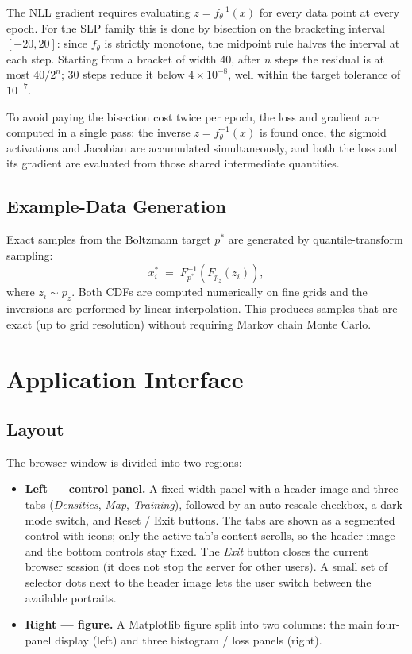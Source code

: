 \documentclass[11pt,a4paper]{article}
\newcommand{\pz}{p_z}
\newcommand{\ft}{f_{\!\theta}}
\begin{document}
The NLL gradient requires evaluating $z = \ft^{-1}(x)$ for every data
point at every epoch.  For the SLP family this is done by bisection on the
bracketing interval $[-20, 20]$: since $\ft$ is strictly monotone, the
midpoint rule halves the interval at each step.  Starting from a bracket
of width 40, after $n$ steps the residual is at most $40/2^n$; 30 steps
reduce it below $4\times10^{-8}$, well within the target tolerance of
$10^{-7}$.

To avoid paying the bisection cost twice per epoch, the loss and gradient
are computed in a single pass: the inverse $z = \ft^{-1}(x)$ is found
once, the sigmoid activations and Jacobian are accumulated simultaneously,
and both the loss and its gradient are evaluated from those shared
intermediate quantities.

\subsection{Example-Data Generation}

Exact samples from the Boltzmann target $p^*$ are generated by
quantile-transform sampling:
\begin{equation}
  x_i^* \;=\; F_{p^*}^{-1}\!\left(F_{\pz}(z_i)\right),
\end{equation}
where $z_i \sim \pz$.  Both CDFs are computed numerically on fine grids
and the inversions are performed by linear interpolation.  This produces
samples that are exact (up to grid resolution) without requiring Markov
chain Monte Carlo.

\section{Application Interface}

\subsection{Layout}

The browser window is divided into two regions:
\begin{itemize}
  \item \textbf{Left — control panel.}  A fixed-width panel with a header
        image and three tabs (\emph{Densities}, \emph{Map}, \emph{Training}),
        followed by an auto-rescale checkbox, a dark-mode switch, and
        Reset / Exit buttons.  The tabs are shown as a segmented control with
        icons; only the active tab's content scrolls, so the header image and
        the bottom controls stay fixed.  The \emph{Exit} button closes the
        current browser session (it does not stop the server for other users).
        A small set of selector dots next to the header image lets the user
        switch between the available portraits.
  \item \textbf{Right — figure.}  A Matplotlib figure split into two
        columns: the main four-panel display (left) and three histogram /
        loss panels (right).
\end{itemize}
\end{document}
